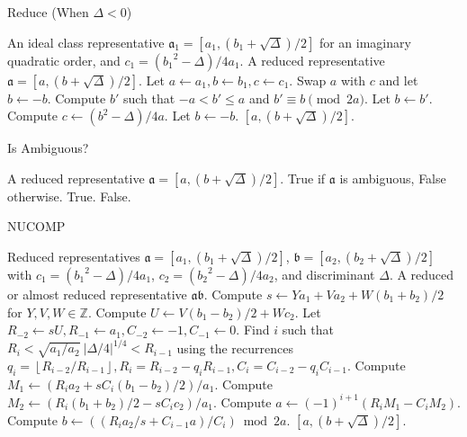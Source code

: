 \documentclass{ucalgthes1}
\theoremstyle{plain}
\theoremstyle{definition}
\newcommand{\ZZ}{\mathbb{Z}}
\newcommand{\floor}[1]{\left\lfloor #1 \right\rfloor}
\begin{document}
\begin{algorithm}[h]
\caption{Reduce (When $\Delta < 0$)}
\label{alg:reduce}
\begin{algorithmic}[1]
\REQUIRE An ideal class representative $\mathfrak a_1 = [a_1, (b_1+\sqrt\Delta)/2]$ for an imaginary quadratic order, and $c_1 = ({b_1}^2 - \Delta)/4a_1$.
\ENSURE A reduced representative $\mathfrak a = [a, (b+\sqrt\Delta)/2]$.
\STATE Let $a \leftarrow a_1, b \leftarrow b_1, c \leftarrow c_1$.
		\STATE Swap $a$ with $c$ and let $b \leftarrow -b$.
	\ENDIF
		\STATE Compute $b'$ such that $-a < b' \le a$ and $b' \equiv b \pmod{2a}$.
		\STATE Let $b \leftarrow b'$.
		\STATE Compute $c \leftarrow (b^2-\Delta)/4a$.
	\ENDIF
\ENDWHILE
{}
	\STATE Let $b \leftarrow -b$.
\ENDIF
\RETURN $[a, (b+\sqrt\Delta)/2]$.
\end{algorithmic}
\end{algorithm}



\begin{algorithm}[h]
\caption{Is Ambiguous?}
\label{alg:ambiguous}
\begin{algorithmic}[1]
\REQUIRE A reduced representative $\mathfrak a = [a, (b+\sqrt\Delta)/2]$.
\ENSURE True if $\mathfrak a$ is ambiguous, False otherwise.
		\RETURN True.
	\ENDIF
\ENDIF
\RETURN False.
\end{algorithmic}
\end{algorithm}


\begin{algorithm}[h]
\caption{NUCOMP}
\label{alg:nucomp}
\begin{algorithmic}[1]
\REQUIRE Reduced representatives $\mathfrak a = [a_1, (b_1+\sqrt\Delta)/2]$, $\mathfrak b = [a_2, (b_2+\sqrt\Delta)/2]$ with \break $c_1 = ({b_1}^2-\Delta)/4a_1$, $c_2 = ({b_2}^2-\Delta)/4a_2$, and discriminant $\Delta$.
\ENSURE A reduced or almost reduced representative $\mathfrak a \mathfrak b$.
\STATE Compute $s \leftarrow Ya_1 + Va_2 + W (b_1+b_2)/2$ for $Y, V, W \in \ZZ$.
\STATE Compute $U \leftarrow V(b_1-b_2)/2 + Wc_2$.
\STATE Let $R_{-2} \leftarrow sU, R_{-1} \leftarrow a_1, C_{-2} \leftarrow -1, C_{-1} \leftarrow 0$.
\STATE Find $i$ such that $R_i < \sqrt{a_1/a_2} ~ |\Delta/4|^{1/4} < R_{i-1}$ using the recurrences \break $q_i = \floor{R_{i-2}/R_{i-1}}, R_i = R_{i-2}-q_i R_{i-1}, C_i=C_{i-2}-q_i C_{i-1}$.
\STATE Compute $M_1 \leftarrow (R_i a_2 + sC_i(b_1-b_2)/2)/a_1$.
\STATE Compute $M_2 \leftarrow (R_i (b_1+b_2)/2 -sC_i c_2)/a_1$.
\STATE Compute $a \leftarrow (-1)^{i+1}(R_i M_1 - C_i M_2)$.
\STATE Compute $b \leftarrow ((R_i a_2/s + C_{i-1} a)/C_i) \bmod{2a}$.
\RETURN $[a, (b+\sqrt\Delta)/2]$.
\end{algorithmic}
\end{algorithm}
\end{document}
